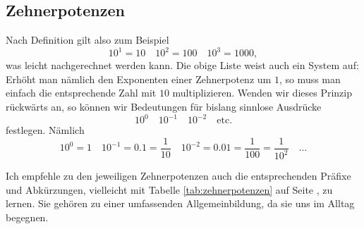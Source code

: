\documentclass[%
11pt,%
twoside,%
titlepage,%
swissgerman,%
headsepline%
]{scrartcl}
\theoremstyle{definition}
\theoremstyle{plain}
\begin{document}
\subsection{Zehnerpotenzen}
Nach Definition gilt also zum Beispiel
$$10^1=10\quad 10^2=100\quad 10^3=1000,$$
was leicht nachgerechnet werden kann. Die obige Liste weist auch ein System auf: Erhöht man nämlich den Exponenten einer Zehnerpotenz um $1$, so muss man einfach die entsprechende Zahl mit $10$ multiplizieren. Wenden wir dieses Prinzip rückwärts an, so können wir Bedeutungen für bislang sinnlose Ausdrücke
$$10^0\quad 10^{-1}\quad 10^{-2}\quad\text{etc.}$$
festlegen. Nämlich
$$10^0=1\quad10^{-1}=0.1=\frac{1}{10}\quad10^{-2}=0.01=\frac{1}{100}=\frac{1}{10^2}\quad\dots$$

Ich empfehle zu den jeweiligen Zehnerpotenzen auch die entsprechenden Präfixe und Ab\-kür\-zungen, vielleicht mit Tabelle \ref{tab:zehnerpotenzen} auf Seite \pageref{tab:zehnerpotenzen}, zu lernen. Sie gehören zu einer umfassenden Allgemeinbildung, da sie uns im Alltag begegnen.
\end{document}
